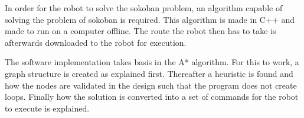 
In order for the robot to solve the sokoban problem, an algorithm capable of solving the problem of sokoban is required.
This algorithm is made in C++ and made to run on a computer offline.
The route the robot then has to take is afterwards downloaded to the robot for execution.

The software implementation takes basis in the A* algorithm.
For this to work, a graph structure is created as explained first. 
Thereafter a heuristic is found and how the nodes are validated in the design such that the program does not create loops.
Finally how the solution is converted into a set of commands for the robot to execute is explained.
